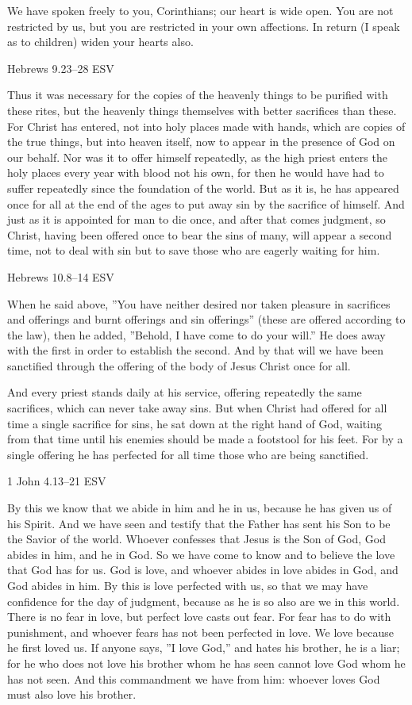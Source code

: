 \documentclass[
]{article}
\newcommand{\RL}[1]{\beginR #1\endR}
\begin{document}
We have spoken freely to you, Corinthians; our heart is wide open. You
are not restricted by us, but you are restricted in your own affections.
In return (I speak as to children) widen your hearts also.

Hebrews 9.23--28 ESV

Thus it was necessary for the copies of the heavenly things to be
purified with these rites, but the heavenly things themselves with
better sacrifices than these. For Christ has entered, not into holy
places made with hands, which are copies of the true things, but into
heaven itself, now to appear in the presence of God on our behalf. Nor
was it to offer himself repeatedly, as the high priest enters the holy
places every year with blood not his own, for then he would have had to
suffer repeatedly since the foundation of the world. But as it is, he
has appeared once for all at the end of the ages to put away sin by the
sacrifice of himself. And just as it is appointed for man to die once,
and after that comes judgment, so Christ, having been offered once to
bear the sins of many, will appear a second time, not to deal with sin
but to save those who are eagerly waiting for him.

Hebrews 10.8--14 ESV

When he said above, \RL{''}You have neither desired nor taken pleasure
in sacrifices and offerings and burnt offerings and sin offerings''
(these are offered according to the law), then he added, \RL{''}Behold,
I have come to do your will.'' He does away with the first in order to
establish the second. And by that will we have been sanctified through
the offering of the body of Jesus Christ once for all.

And every priest stands daily at his service, offering repeatedly the
same sacrifices, which can never take away sins. But when Christ had
offered for all time a single sacrifice for sins, he sat down at the
right hand of God, waiting from that time until his enemies should be
made a footstool for his feet. For by a single offering he has perfected
for all time those who are being sanctified.

1 John 4.13--21 ESV

By this we know that we abide in him and he in us, because he has given
us of his Spirit. And we have seen and testify that the Father has sent
his Son to be the Savior of the world. Whoever confesses that Jesus is
the Son of God, God abides in him, and he in God. So we have come to
know and to believe the love that God has for us. God is love, and
whoever abides in love abides in God, and God abides in him. By this is
love perfected with us, so that we may have confidence for the day of
judgment, because as he is so also are we in this world. There is no
fear in love, but perfect love casts out fear. For fear has to do with
punishment, and whoever fears has not been perfected in love. We love
because he first loved us. If anyone says, \RL{''}I love God,'' and
hates his brother, he is a liar; for he who does not love his brother
whom he has seen cannot love God whom he has not seen. And this
commandment we have from him: whoever loves God must also love his
brother.
\end{document}
